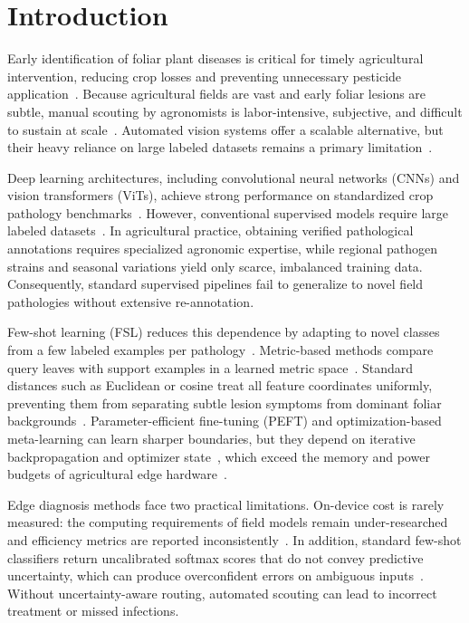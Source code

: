 
\section{Introduction}
\label{sec:intro}
Early identification of foliar plant diseases is critical for timely agricultural intervention, reducing crop losses and preventing unnecessary pesticide application~\cite{richard2022control}. Because agricultural fields are vast and early foliar lesions are subtle, manual scouting by agronomists is labor-intensive, subjective, and difficult to sustain at scale~\cite{shoaib2023advanced,radocaj2025evolution}. Automated vision systems offer a scalable alternative, but their heavy reliance on large labeled datasets remains a primary limitation~\cite{shoaib2023advanced}.

Deep learning architectures, including convolutional neural networks (CNNs) and vision transformers (ViTs), achieve strong performance on standardized crop pathology benchmarks~\cite{gupta2024fruit,dinesh2025plant}. However, conventional supervised models require large labeled datasets~\cite{shoaib2023advanced}. In agricultural practice, obtaining verified pathological annotations requires specialized agronomic expertise, while regional pathogen strains and seasonal variations yield only scarce, imbalanced training data. Consequently, standard supervised pipelines fail to generalize to novel field pathologies without extensive re-annotation.

Few-shot learning (FSL) reduces this dependence by adapting to novel classes from a few labeled examples per pathology~\cite{sun2024few}. Metric-based methods compare query leaves with support examples in a learned metric space~\cite{zhao2024mafde,snell2017prototypical}. Standard distances such as Euclidean or cosine treat all feature coordinates uniformly, preventing them from separating subtle lesion symptoms from dominant foliar backgrounds~\cite{bateni2020improved}. Parameter-efficient fine-tuning (PEFT) and optimization-based meta-learning can learn sharper boundaries, but they depend on iterative backpropagation and optimizer state~\cite{hu2022lora,finn2017maml}, which exceed the memory and power budgets of agricultural edge hardware~\cite{radocaj2025evolution}.

Edge diagnosis methods face two practical limitations. On-device cost is rarely measured: the computing requirements of field models remain under-researched and efficiency metrics are reported inconsistently~\cite{radocaj2025evolution}. In addition, standard few-shot classifiers return uncalibrated softmax scores that do not convey predictive uncertainty, which can produce overconfident errors on ambiguous inputs~\cite{guo2017calibration}. Without uncertainty-aware routing, automated scouting can lead to incorrect treatment or missed infections.

